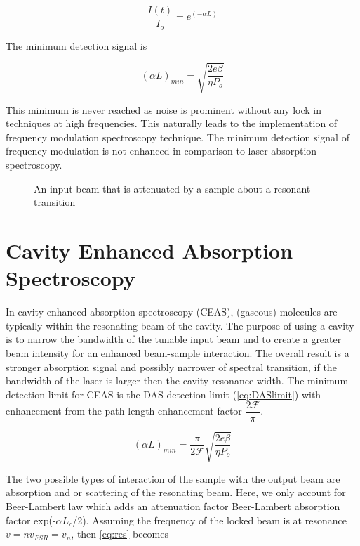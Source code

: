 \documentclass[11pt,a4paper]{book}
\newcommand{\imginput}[1]{} %
\begin{document}
		\begin{equation}
			\label{eq:BeerLamberts}
			\dfrac{I(t)}{I_o} = e^{(-\alpha L)}
		\end{equation}
		
		\noindent
		The minimum detection signal is \cite{NICE-OHMS}
		
		\begin{equation}
			\label{eq:DASlimit}
			(\alpha L)_{min} = \sqrt{\dfrac{2e \beta}{ \eta P_o}}
		\end{equation}
		
		\noindent This minimum is never reached as noise is prominent without any lock in techniques at high frequencies. This naturally leads to the implementation of frequency modulation spectroscopy technique. The minimum detection signal of frequency modulation is not enhanced in comparison to laser absorption spectroscopy.
		\begin{figure} [!ht]
			\centering
			\def\svgwidth{\columnwidth}
			\resizebox{150mm}{!}{\imginput{images/dir-abs-spec.pdf_tex}}
			\label{fig:dir-abs-spec}
			\caption{An input beam that is attenuated by a sample about a resonant transition}
		\end{figure}		
	
	\section{Cavity Enhanced Absorption Spectroscopy}
		\label{sec:Cavity Enhanced Absorption Spectroscopy}
		In cavity enhanced absorption spectroscopy (CEAS), (gaseous) molecules are typically within the resonating beam of the cavity.
		The purpose of using a cavity is to narrow the bandwidth of the tunable input beam and to create a greater beam intensity for an enhanced beam-sample interaction. The overall result is a stronger absorption signal and possibly narrower of spectral transition, if the bandwidth of the laser is larger then the cavity resonance width. The minimum detection limit for CEAS is the DAS detection limit (\autoref{eq:DASlimit}) with enhancement from the path length enhancement factor $\dfrac{2\mathcal{F}}{\pi}$.
		
		\begin{equation}
			\label{eq:CEASlimit}
			(\alpha L)_{min}=\dfrac{\pi}{2 \mathcal{F}}\sqrt{\dfrac{2e \beta}{\eta P_o}}
		\end{equation}
		
		The two possible types of interaction of the sample with the output beam are absorption and or scattering of the resonating beam. Here, we only account for Beer-Lambert law which adds an attenuation factor Beer-Lambert absorption factor exp(-$\alpha L_c$/2).
		Assuming the frequency of the locked beam is at resonance $v=nv_{FSR}=v_n$, then \eqref{eq:res} becomes 
		
\end{document}
